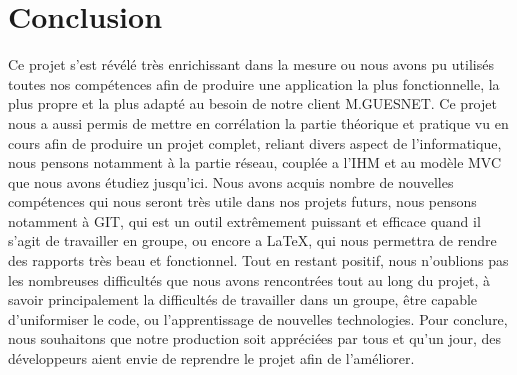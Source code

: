 \section*{Conclusion}

	Ce projet s'est révélé très enrichissant dans la mesure ou nous avons pu utilisés toutes nos compétences afin de produire une application la plus fonctionnelle, la plus propre et la plus adapté au besoin de notre client M.GUESNET.\newline
	Ce projet nous a aussi permis de mettre en corrélation la partie théorique et pratique vu en cours afin de produire un projet complet, reliant divers aspect de l'informatique, nous pensons notamment à la partie réseau, couplée a l'IHM et au modèle MVC que nous avons étudiez jusqu'ici.
	Nous avons acquis nombre de nouvelles compétences qui nous seront très utile dans nos projets futurs, nous pensons notamment à GIT, qui est un outil extrêmement puissant et efficace quand il s'agit de travailler en groupe, ou encore a \LaTeX{}, qui nous permettra de rendre des rapports très beau et fonctionnel.\newline
	Tout en restant positif, nous n'oublions pas les nombreuses difficultés que nous avons rencontrées tout au long du projet, à savoir principalement la difficultés de travailler dans un groupe, être capable d'uniformiser le code, ou l'apprentissage de nouvelles technologies.\newline
	Pour conclure, nous souhaitons que notre production soit appréciées par tous et qu'un jour, des développeurs aient envie de reprendre le projet afin de l'améliorer.
	
